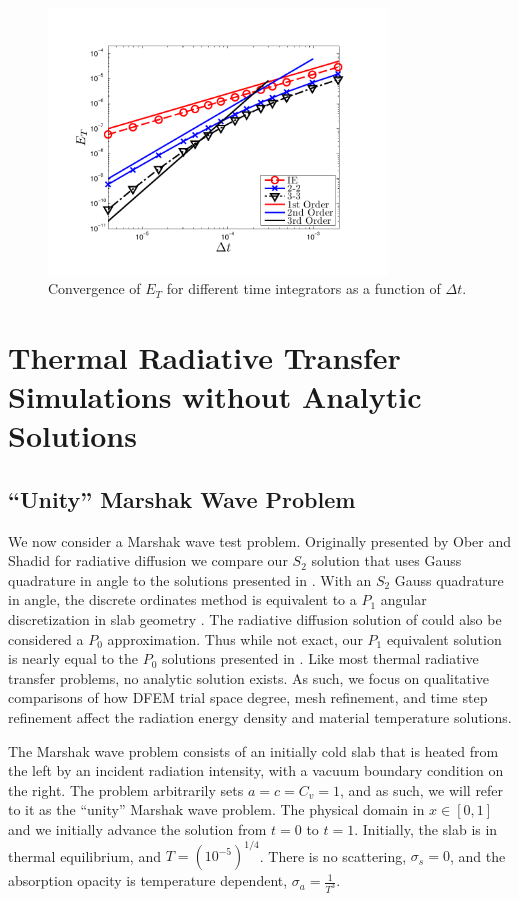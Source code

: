 \begin{figure}[!htp]
\centering
\includegraphics[width=9cm,trim=0.25in  0.2in 0.75in 0.5in,clip=true]{chapter6_grey_radtran/Dissertation_Data/Time_Integrators_Convergence_Temperature.pdf}
\caption{Convergence of $E_{T}$ for different time integrators as a function of $\Delta t$.}
\label{fig:big_dt}
\end{figure}


\section{Thermal Radiative Transfer Simulations without Analytic Solutions}
\label{sec:marshak_waves}

\subsection{``Unity'' Marshak Wave Problem}

We now consider a Marshak wave test problem.
Originally presented by Ober and Shadid for radiative diffusion \cite{ober_shadid} we compare our $S_2$ solution that uses Gauss quadrature in angle to the solutions presented in \cite{ober_shadid}.
With an $S_2$ Gauss quadrature in angle, the discrete ordinates method is equivalent to a $P_1$ angular discretization in slab geometry \cite{s2sa}.
The radiative diffusion solution of \cite{ober_shadid} could also be considered a $P_0$ approximation.
Thus while not exact, our $P_1$ equivalent solution is nearly equal to the $P_0$ solutions presented in \cite{ober_shadid}.
Like most thermal radiative transfer problems, no analytic solution exists.  
As such, we focus on qualitative comparisons of how DFEM trial space degree, mesh refinement, and time step refinement affect the radiation energy density and material temperature solutions.

The Marshak wave problem consists of an initially cold slab that is heated from the left by an incident radiation intensity, with a vacuum boundary condition on the right.
The problem arbitrarily sets $a=c=C_v=1$, and as such, we will refer to it as the ``unity'' Marshak wave problem.  The physical domain in $x\in[0,1]$ and we initially advance the solution from $t=0$ to $t=1$.
Initially, the slab is in thermal equilibrium, and $T=\left( 10^{-5} \right)^{1/4}$.
There is no scattering, $\sigma_s = 0$, and the absorption opacity is temperature dependent, $\sigma_a = \frac{1}{T^3}$.

